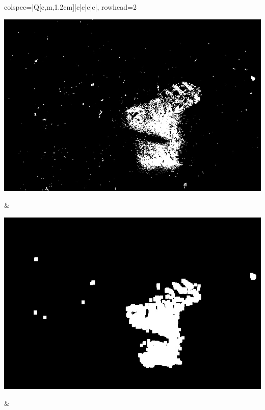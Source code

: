\begin{longtblr}[
            caption = {Hasil uji coba proses \textit{background subtraction} menggunakan GMM yang disempurnakan oleh Operasi Morfologi},
            label = {tab:gmm_morph_9908}
        ]{
            colspec={|Q[c,m,1.2cm]|c|c|c|c|},
            rowhead=2
        }
\begin{minipage}{0.19\textwidth}
                \includegraphics[width=\linewidth]{image/9908/9908_gmm_frame230.jpg}
            \end{minipage} & 
            \begin{minipage}{0.19\textwidth}
                \includegraphics[width=\linewidth]{image/9908/9908_dilated_3x9_frame230.jpg}
            \end{minipage} &
            \begin{minipage}{0.19\textwidth}

\end{minipage}
\end{longtblr}
